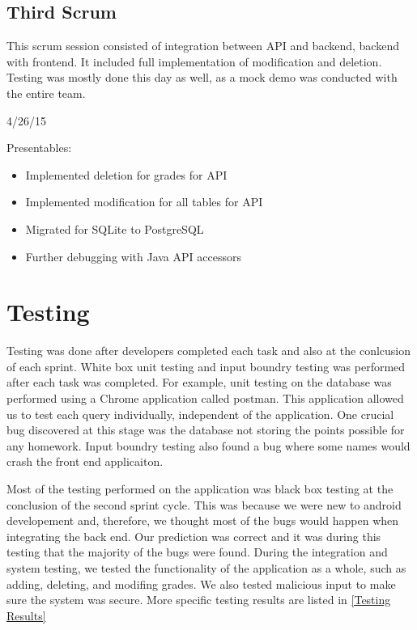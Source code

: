 \documentclass[a4paper]{article} %
\begin{document}
\subsection{Third Scrum}

This scrum session consisted of integration between API and backend, backend with frontend. It included full implementation of modification and deletion. Testing was mostly done this day as well, as a mock demo was conducted with the entire team. 

4/26/15


Presentables: 

\begin{itemize}
  \item Implemented deletion for grades for API
    \item Implemented modification for all tables for API
    \item Migrated for SQLite to PostgreSQL
    \item Further debugging with Java API accessors
\end{itemize}

\section{Testing}
Testing was done after developers completed each task and also at the conlcusion of each sprint. White box unit testing and input boundry testing was performed after each task was completed. For example, unit testing on the database was performed using a Chrome application called postman. This application allowed us to test each query individually, independent of the application. One crucial bug discovered at this stage was the database not storing the points possible for any homework. Input boundry testing also found a bug where some names would crash the front end applicaiton.

Most of the testing performed on the application was black box testing at the conclusion of the second sprint cycle. This was because we were new to android developement and, therefore, we thought most of the bugs would happen when integrating the back end. Our prediction was correct and it was during this testing that the majority of the bugs were found. During the integration and system testing, we tested the functionality of the application as a whole, such as adding, deleting, and modifing grades. We also tested malicious input to make sure the system was secure. More specific testing results are listed in \ref{Testing Results}
\end{document}
